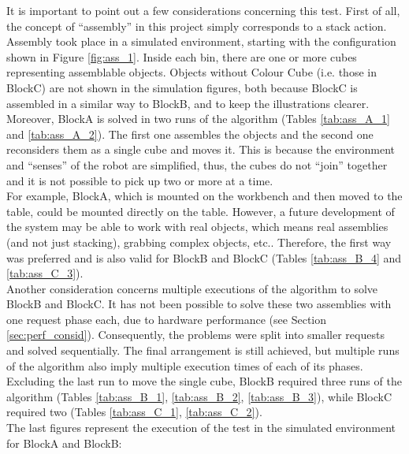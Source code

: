 It is important to point out a few considerations concerning this test. First of all, the concept of \enquote{assembly} in this project simply corresponds to a stack action. \\
Assembly took place in a simulated environment, starting with the configuration shown in Figure \ref{fig:ass_1}. 
Inside each bin, there are one or more cubes representing assemblable objects. Objects without Colour Cube (i.e. those in BlockC) are not shown in the simulation figures, both because BlockC is assembled in a similar way to BlockB, and to keep the illustrations clearer. \\
Moreover, BlockA is solved in two runs of the algorithm (Tables \ref{tab:ass_A_1} and \ref{tab:ass_A_2}). 
The first one assembles the objects and the second one reconsiders them as a single cube and moves it. This is because the environment and \enquote{senses} of the robot are simplified, thus, the cubes do not \enquote{join} together and it is not possible to pick up two or more at a time. \\
For example, BlockA, which is mounted on the workbench and then moved to the table, could be mounted directly on the table. However, a future development of the system may be able to work with real objects, which means real assemblies (and not just stacking), grabbing complex objects, etc.. Therefore, the first way was preferred and is also valid for BlockB and BlockC (Tables \ref{tab:ass_B_4} and \ref{tab:ass_C_3}). \\
Another consideration concerns multiple executions of the algorithm to solve BlockB and BlockC. It has not been possible to solve these two assemblies with one request phase each, due to hardware performance (see Section \ref{sec:perf_consid}). Consequently, the problems were split into smaller requests and solved sequentially. The final arrangement is still achieved, but multiple runs of the algorithm also imply multiple execution times of each of its phases.
Excluding the last run to move the single cube, BlockB required three runs of the algorithm (Tables \ref{tab:ass_B_1}, \ref{tab:ass_B_2}, \ref{tab:ass_B_3}), while BlockC required two (Tables \ref{tab:ass_C_1}, \ref{tab:ass_C_2}). \\
The last figures represent the execution of the test in the simulated environment for BlockA and BlockB:
